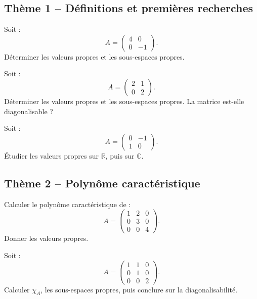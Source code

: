 \documentclass[11pt,a4paper]{article}
\newcommand{\R}{\mathbb R}
\newcommand{\C}{\mathbb C}
\begin{document}
\subsection*{Thème 1 -- Définitions et premières recherches}

\begin{exercicebox}[1]
Soit :
\[
A=
\begin{pmatrix}
4&0\\
0&-1
\end{pmatrix}.
\]
Déterminer les valeurs propres et les sous-espaces propres.
\end{exercicebox}

\begin{exercicebox}[2]
Soit :
\[
A=
\begin{pmatrix}
2&1\\
0&2
\end{pmatrix}.
\]
Déterminer les valeurs propres et les sous-espaces propres.  
La matrice est-elle diagonalisable ?
\end{exercicebox}

\begin{exercicebox}[3]
Soit :
\[
A=
\begin{pmatrix}
0&-1\\
1&0
\end{pmatrix}.
\]
Étudier les valeurs propres sur \(\R\), puis sur \(\C\).
\end{exercicebox}

\subsection*{Thème 2 -- Polynôme caractéristique}

\begin{exercicebox}[4]
Calculer le polynôme caractéristique de :
\[
A=
\begin{pmatrix}
1&2&0\\
0&3&0\\
0&0&4
\end{pmatrix}.
\]
Donner les valeurs propres.
\end{exercicebox}

\begin{exercicebox}[5]
Soit :
\[
A=
\begin{pmatrix}
1&1&0\\
0&1&0\\
0&0&2
\end{pmatrix}.
\]
Calculer \(\chi_A\), les sous-espaces propres, puis conclure sur la diagonalisabilité.
\end{exercicebox}
\end{document}
